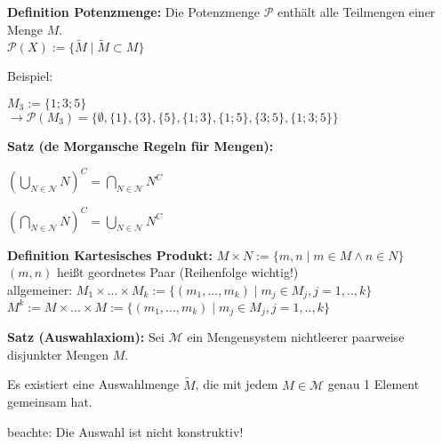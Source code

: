 \documentclass[11pt]{article}
\begin{document}
		\begin{framed}
			\textbf{Definition Potenzmenge:} Die Potenzmenge $\mathcal P$ enth\"alt alle Teilmengen einer 				Menge $M$. \\
			$\mathcal P(X) := \{\tilde M \mid \tilde M \subset M\}$ 
		\end{framed}

		Beispiel:
		\begin{compactitem}
			\item $M_3 := \{1;3;5\}$ \\
			$\to \mathcal P(M_3) = \{\emptyset, \{1\}, \{3\}, \{5\}, \{1;3\}, \{1;5\}, \{3;5\}, \{1;3;5\}\}$
		\end{compactitem}

		\begin{framed}
			\textbf{Satz (de Morgansche Regeln f\"ur Mengen):}
			\begin{compactitem}
				\item $(\mathop{\bigcup}_{N \in \mathcal N} N)^C = \mathop{\bigcap}_{N \in \mathcal N} N^C$ 
				\item $(\mathop{\bigcap}_{N \in \mathcal N} N)^C = \mathop{\bigcup}_{N \in \mathcal N} N^C$ 
			\end{compactitem}
		\end{framed}

		\begin{framed}
			\textbf{Definition Kartesisches Produkt:} 
			$M \times N := \{m,n \mid m \in M \land n \in N\}$ \\
			$(m,n)$ hei{\ss}t geordnetes Paar (Reihenfolge wichtig!) \\
			allgemeiner: $M_1 \times ... \times M_k := \{(m_1,...,m_k) \mid m_j \in M_j, j=1, .., k\}$ \\
			$M^k := M \times ... \times M := \{(m_1,...,m_k) \mid m_j \in M_j, j=1, .., k\}$ 
		\end{framed}

		\begin{framed}
			\textbf{Satz (Auswahlaxiom): } Sei $\mathcal M$ ein Mengensystem nichtleerer paarweise disjunkter 				Mengen $M$.
			\begin{compactitem}
			\item Es existiert eine Auswahlmenge $\tilde M$, die mit jedem $M \in \mathcal M$ genau 1 Element 				gemeinsam hat.
			\item beachte: Die Auswahl ist nicht konstruktiv!
			\end{compactitem}
		\end{framed}
\end{document}
